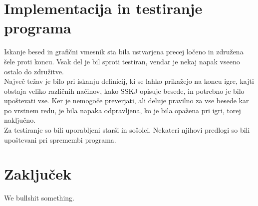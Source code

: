 \documentclass [a4paper, 12pt] {article}
\begin{document}
\section {Implementacija in testiranje programa}
Iskanje besed in grafični vmesnik sta bila ustvarjena precej ločeno in združena šele proti koncu. Vsak del je bil sproti testiran, vendar je nekaj napak vseeno ostalo do združitve. \\
Največ težav je bilo pri iskanju definicij, ki se lahko prikažejo na koncu igre, kajti obstaja veliko različnih načinov, kako SSKJ opisuje besede, in potrebno je bilo upoštevati vse. Ker je nemogoče preverjati, ali deluje pravilno za vse besede kar po vrstnem redu, je bila napaka odpravljena, ko je bila opažena pri igri, torej naključno. \\
Za testiranje so bili uporabljeni starši in sošolci. Nekateri njihovi predlogi so bili upoštevani pri spremembi programa.

\section {Zaključek}
We bullshit something.
\end{document}
